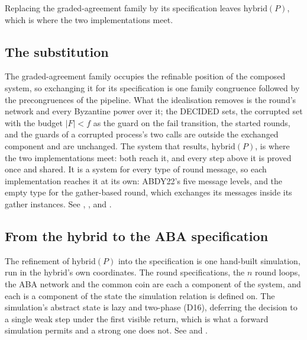 Replacing the graded-agreement family by its specification leaves $\mathrm{hybrid}(P)$, which is where the two implementations meet.

\subsection{The substitution}

The graded-agreement family occupies the refinable position of the composed system, so exchanging it for its specification is one family congruence followed by the precongruences of the pipeline.
What the idealisation removes is the round's network and every Byzantine power over it; the DECIDED sets, the corrupted set with the budget $|F| < f$ as the guard on the $\mathrm{fail}$ transition, the started rounds, and the guards of a corrupted process's two calls are outside the exchanged component and are unchanged.
The system that results, $\mathrm{hybrid}(P)$, is where the two implementations meet: both reach it, and every step above it is proved once and shared.
It is a system for every type of round message, so each implementation reaches it at its own: ABDY22's five message levels, and the empty type for the gather-based round, which exchanges its messages inside its gather instances.
See , ,  and .





\subsection{From the hybrid to the ABA specification}

The refinement of $\mathrm{hybrid}(P)$ into the specification is one hand-built simulation, run in the hybrid's own coordinates.
The round specifications, the $n$ round loops, the ABA network and the common coin are each a component of the system, and each is a component of the state the simulation relation is defined on.
The simulation's abstract state is lazy and two-phase (D16), deferring the decision to a single weak step under the first visible return, which is what a forward simulation permits and a strong one does not.
See  and .

